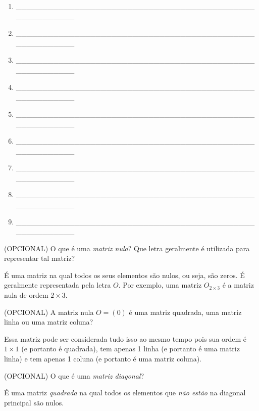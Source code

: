 \documentclass[pdftex, brazil, 12pt, oneside, addpoints]{exam}
\begin{document}
\begin{questions}
\begin{enumerate}
  \item \_\_\_\_\_\_\_\_\_\_\_\_\_\_\_\_\_\_\_\_\_\_\_\_\_\_\_\_\_\_\_\_\_\_\_\_\_\_\_\_\_\_\_\_\_\_\_\_\_\_\_\_\_\_\_\_
  \item \_\_\_\_\_\_\_\_\_\_\_\_\_\_\_\_\_\_\_\_\_\_\_\_\_\_\_\_\_\_\_\_\_\_\_\_\_\_\_\_\_\_\_\_\_\_\_\_\_\_\_\_\_\_\_\_
  \item \_\_\_\_\_\_\_\_\_\_\_\_\_\_\_\_\_\_\_\_\_\_\_\_\_\_\_\_\_\_\_\_\_\_\_\_\_\_\_\_\_\_\_\_\_\_\_\_\_\_\_\_\_\_\_\_
  \item \_\_\_\_\_\_\_\_\_\_\_\_\_\_\_\_\_\_\_\_\_\_\_\_\_\_\_\_\_\_\_\_\_\_\_\_\_\_\_\_\_\_\_\_\_\_\_\_\_\_\_\_\_\_\_\_
  \item \_\_\_\_\_\_\_\_\_\_\_\_\_\_\_\_\_\_\_\_\_\_\_\_\_\_\_\_\_\_\_\_\_\_\_\_\_\_\_\_\_\_\_\_\_\_\_\_\_\_\_\_\_\_\_\_
  \item \_\_\_\_\_\_\_\_\_\_\_\_\_\_\_\_\_\_\_\_\_\_\_\_\_\_\_\_\_\_\_\_\_\_\_\_\_\_\_\_\_\_\_\_\_\_\_\_\_\_\_\_\_\_\_\_
  \item \_\_\_\_\_\_\_\_\_\_\_\_\_\_\_\_\_\_\_\_\_\_\_\_\_\_\_\_\_\_\_\_\_\_\_\_\_\_\_\_\_\_\_\_\_\_\_\_\_\_\_\_\_\_\_\_
  \item \_\_\_\_\_\_\_\_\_\_\_\_\_\_\_\_\_\_\_\_\_\_\_\_\_\_\_\_\_\_\_\_\_\_\_\_\_\_\_\_\_\_\_\_\_\_\_\_\_\_\_\_\_\_\_\_
  \item \_\_\_\_\_\_\_\_\_\_\_\_\_\_\_\_\_\_\_\_\_\_\_\_\_\_\_\_\_\_\_\_\_\_\_\_\_\_\_\_\_\_\_\_\_\_\_\_\_\_\_\_\_\_\_\_    
\end{enumerate}
\fi

\question
(OPCIONAL) O que é uma \emph{matriz nula}? Que letra geralmente é utilizada para representar tal matriz?
\begin{solution}
  É uma matriz na qual todos os seus elementos são nulos, ou seja, são zeros. É geralmente
  representada pela letra $O$. Por exemplo, uma matriz $O_{2 \times 3}$ é a matriz nula
  de ordem $2 \times 3$.
\end{solution}

\question
(OPCIONAL) A matriz nula $O = (0)$ é uma matriz quadrada, uma matriz linha ou uma matriz coluna?
\begin{solution}
  Essa matriz pode ser considerada tudo isso ao mesmo tempo pois sua ordem é $1 \times 1$
  (e portanto é quadrada), tem apenas 1 linha (e portanto é uma matriz linha) e tem apenas
  1 coluna (e portanto é uma matriz coluna).
\end{solution}

\question
(OPCIONAL) O que é uma \emph{matriz diagonal}?
\begin{solution}
  É uma matriz \emph{quadrada} na qual todos os elementos que \emph{não estão}
  na diagonal principal são nulos.
\end{solution}


\end{questions}
\end{document}
